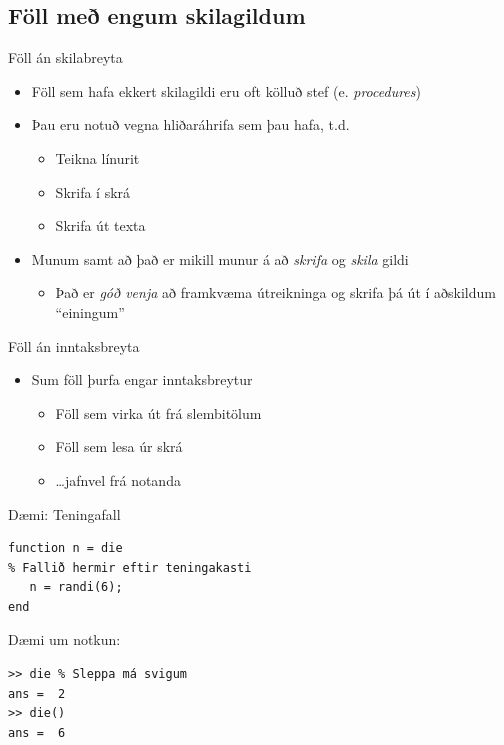 \documentclass{beamer}
\begin{document}
\subsection{Föll með engum skilagildum}

\begin{frame}{Föll án skilabreyta}
\begin{itemize}
 \item Föll sem hafa ekkert skilagildi eru oft kölluð stef (e. \emph{procedures})
 \item Þau eru notuð vegna hliðaráhrifa sem þau hafa, t.d.
 \begin{itemize}
  \item Teikna línurit
  \item Skrifa í skrá \pause
  \item Skrifa út texta
 \end{itemize}
 \item Munum samt að það er mikill munur á að \emph{skrifa} og \emph{skila} gildi
 \begin{itemize}
  \item Það er \emph{góð venja} að framkvæma útreikninga og skrifa þá út í aðskildum ``einingum''
 \end{itemize}
\end{itemize}
\end{frame}

\begin{frame}{Föll án inntaksbreyta}
\begin{itemize}
 \item Sum föll þurfa engar inntaksbreytur
 \begin{itemize}
  \item Föll sem virka út frá slembitölum
  \item Föll sem lesa úr skrá
  \pause
  \item \ldots jafnvel frá notanda
 \end{itemize}
\end{itemize}
\end{frame}

\begin{frame}[fragile]{Dæmi: Teningafall}
\begin{verbatim}
function n = die
% Fallið hermir eftir teningakasti
   n = randi(6);
end
\end{verbatim}
Dæmi um notkun:
\begin{verbatim}
>> die % Sleppa má svigum
ans =  2
>> die()
ans =  6
\end{verbatim}

\end{frame}
\end{document}
